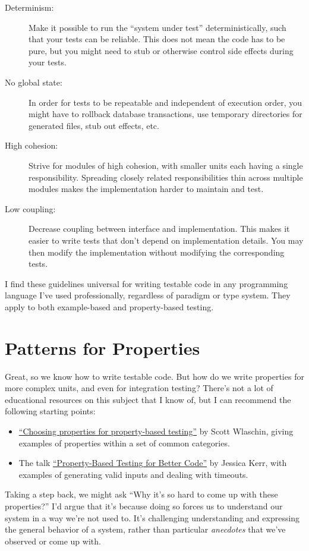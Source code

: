 \begin{description}
\item[Determinism:] Make it possible to run the ``system under test'' deterministically, such that your tests can be reliable. This does not mean the code has to be pure, but you might need to stub or otherwise control side effects during your tests.
\item[No global state:] In order for tests to be repeatable and independent of execution order, you might have to rollback database transactions, use temporary directories for generated files, stub out effects, etc.
\item[High cohesion:] Strive for modules of high cohesion, with smaller units each having a single responsibility. Spreading closely related responsibilities thin across multiple modules makes the implementation harder to maintain and test.
\item[Low coupling:] Decrease coupling between interface and implementation. This makes it easier to write tests that don't depend on implementation details. You may then modify the implementation without modifying the corresponding tests.
\end{description}I find these guidelines universal for writing testable code in any programming language I've used professionally, regardless of paradigm or type system. They apply to both example-based and property-based testing.

\section{Patterns for Properties}


Great, so we know how to write testable code. But how do we write properties for more complex units, and even for integration testing? There's not a lot of educational resources on this subject that I know of, but I can recommend the following starting points:

\begin{itemize}
\item \href{https://fsharpforfunandprofit.com/posts/property-based-testing-2/}{``Choosing properties for property-based testing''} by Scott Wlaschin, giving examples of properties within a set of common categories.
\item The talk \href{https://www.youtube.com/watch?v=shngiiBfD80}{``Property-Based Testing for Better Code''} by Jessica Kerr, with examples of generating valid inputs and dealing with timeouts.
\end{itemize}
Taking a step back, we might ask ``Why it's so hard to come up with these properties?'' I'd argue that it's because doing so forces us to understand our system in a way we're not used to. It's challenging understanding and expressing the general behavior of a system, rather than particular \textit{anecdotes} that we've observed or come up with.

